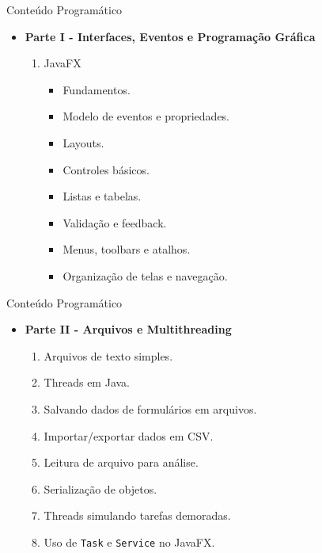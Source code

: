 \documentclass{beamer}
\begin{document}
\begin{frame}{Conteúdo Programático}
    \begin{itemize}
        \item \textbf{Parte I - Interfaces, Eventos e Programação Gráfica}
            \begin{enumerate}
                \justifying
                \item JavaFX
                    \begin{itemize}
                        \item Fundamentos.
                        \item Modelo de eventos e propriedades.
                        \item Layouts.
                        \item Controles básicos.
                        \item Listas e tabelas.
                        \item Validação e feedback.
                        \item Menus, toolbars e atalhos.
                        \item Organização de telas e navegação.
                    \end{itemize}
            \end{enumerate}
    \end{itemize}
\end{frame}

\begin{frame}{Conteúdo Programático}
    \begin{itemize}
        \justifying
        \item \textbf{Parte II - Arquivos e Multithreading}
            \begin{enumerate}
                \justifying
                \item Arquivos de texto simples.
                \item Threads em Java.
                \item Salvando dados de formulários em arquivos.
                \item Importar/exportar dados em CSV.
                \item Leitura de arquivo para análise.
                \item Serialização de objetos.
                \item Threads simulando tarefas demoradas.
                \item Uso de \texttt{Task} e \texttt{Service} no JavaFX.
            \end{enumerate}
    \end{itemize}
\end{frame}
\end{document}

